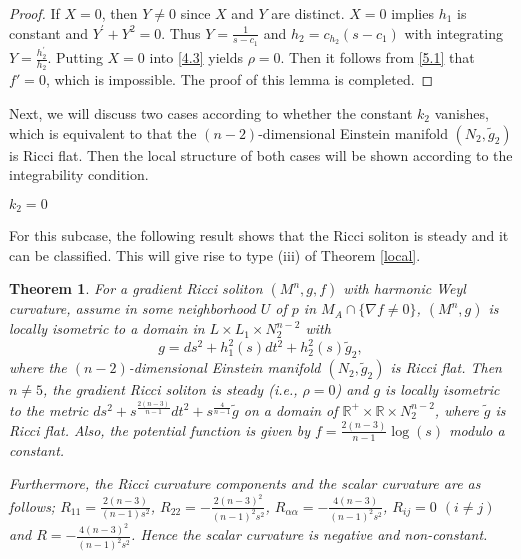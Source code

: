 \documentclass{amsart}
\newtheorem{theorem}{Theorem}[section]
\theoremstyle{definition}
\theoremstyle{remark}
\numberwithin{equation}{section}
\begin{document}
\begin{proof}
	If $X=0$, then $Y\neq0$ since $X$ and $Y$ are distinct.
	$X=0$ implies $h_1$ is constant and $Y^{'} + Y^2=0$. Thus $Y= \frac{1}{s-c_1}$ and 
	$h_2= c_{h_2} (s-c_1)$ with integrating $Y= \frac{h^{'}_2}{h_2}$.
	Putting $X=0$ into \eqref{4.3} yields
	$\rho=0$. 
	Then it follows from \eqref{5.1} that $f'=0$, which is impossible.
	The proof of this lemma is completed. 
\end{proof}	

Next, we will discuss two cases according to 
whether the constant $k_2$ vanishes, which is equivalent to that
the $(n-2)$-dimensional Einstein manifold $(N_2, \tilde{g}_{2})$ is Ricci flat.
Then the local structure of both cases will be shown
according to the integrability condition.

\medskip
{}  \quad $k_2=0$ 

For this subcase, the following result shows that the Ricci soliton is steady and it can be classified. 
This will give rise to type {\rm (iii)} of Theorem \ref{local}.

\begin{theorem} \label{twoone1}
	For a gradient Ricci soliton $\left(M^n, g, f \right) $ with harmonic Weyl curvature,
	assume in some neighborhood $U$ of $p$ in $M_A \cap \{ \nabla f \neq 0  \}$, 
	$(M^n,g)$ is locally isometric to a domain in 
	$L\times L_1\times N^{n-2}_2$
	with
	\[
	g= ds^2 + h^2_1(s)dt^2+h^2_2(s) \tilde{g}_{2}, 
	\]
	where the $(n-2)$-dimensional Einstein manifold $(N_2, \tilde{g}_{2})$ is Ricci flat.
	  Then $n\neq5$, the gradient Ricci soliton is steady {\rm (}i.e., $\rho=0${\rm)} and $g$ is locally isometric to the metric 
	$ds^2 + s^{\frac{2(n-3)}{n-1}} dt^2+ s^{\frac{4}{n-1}} \tilde{g}$ 
	on a domain of $\mathbb{R}^+\times \mathbb{R}\times N^{n-2}_2$, where $ \tilde{g}$ is Ricci flat. 
	Also, the potential function is given by $f=\frac{2(n-3)}{n-1} \log (s)$ modulo a constant.
	
	Furthermore, the Ricci curvature components and the scalar curvature are as follows;
	$R_{11} = \frac{2(n-3)}{(n-1)s^2}$,  $R_{22} = -\frac{2(n-3)^2}{(n-1)^2s^2}$, 
	$R_{\alpha\alpha}= -\frac{4(n-3)}{(n-1)^2s^2}$, $R_{ij} =0$ $(i \neq j)$ and 
	$R= -\frac{4(n-3)^2}{(n-1)^2s^2} $. 
	Hence the scalar curvature is negative and non-constant.
\end{theorem}
\end{document}

